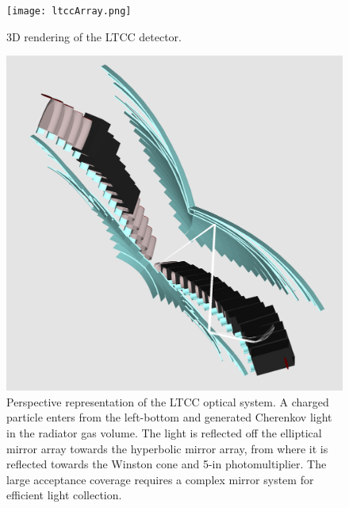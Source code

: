 \documentclass[final,3p,twocolumn]{elsarticle}
\begin{document}
\begin{figure}[htbp!]
\centerline{\texttt{[image: ltccArray.png]}}
\caption{3D rendering of the LTCC detector.}
\label{ltcc}
\end{figure}

\begin{figure}[htbp!]
\centerline{\includegraphics[width=1.0\columnwidth]{ltcc-mod6.png}}
\caption{Perspective representation of the LTCC optical system. A charged particle enters from the left-bottom and
generated Cherenkov light in the radiator gas volume. The light is reflected off the elliptical mirror array towards the
hyperbolic mirror array, from where it is reflected towards the Winston cone and 5-in photomultiplier. The large
acceptance coverage requires a complex mirror system for efficient light collection. }
\label{ltcc}
\end{figure}
\end{document}
